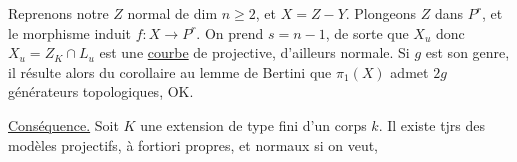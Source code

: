 Reprenons notre $Z$ normal de dim $n\geq2$, et $X=Z-Y$.
Plongeons $Z$ dans $P^r$, et le morphisme induit $f:X\to P^r$.
On prend $s=n-1$, de sorte que
$X_u$ 
donc $X_u=Z_K\cap L_u$ est une \uline{courbe} de
 projective, d'ailleurs normale.
Si $g$ est son genre, il résulte alors du corollaire au lemme de Bertini
que $\pi_1(X)$ admet $2g$ générateurs topologiques, OK.

\uline{Conséquence.} Soit $K$ une extension de type fini d'un corps $k$.
Il existe tjrs des modèles projectifs,
à fortiori propres, et normaux si on veut,

